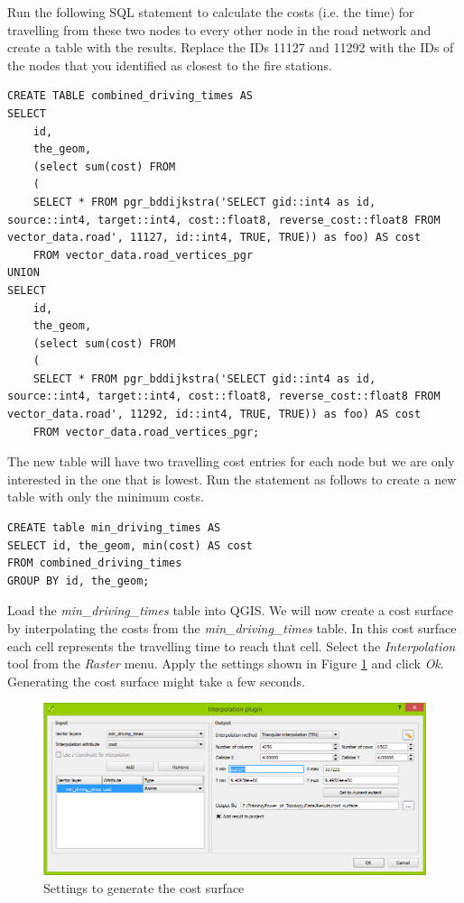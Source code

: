 \documentclass[a4paper,12pt,titlepage]{article}
\begin{document}
Run the following SQL statement to calculate the costs (i.e. the time) for travelling from these two nodes to every other node in the road network and create a table with the results. Replace the IDs 11127 and 11292 with the IDs of the nodes that you identified as closest to the fire stations.

\begin{lstlisting}[caption={Calculating travelling costs}]
CREATE TABLE combined_driving_times AS
SELECT
    id,
    the_geom,
    (select sum(cost) FROM
    (
    SELECT * FROM pgr_bddijkstra('SELECT gid::int4 as id, source::int4, target::int4, cost::float8, reverse_cost::float8 FROM vector_data.road', 11127, id::int4, TRUE, TRUE)) as foo) AS cost
    FROM vector_data.road_vertices_pgr
UNION
SELECT
    id,
    the_geom,
    (select sum(cost) FROM
    (
    SELECT * FROM pgr_bddijkstra('SELECT gid::int4 as id, source::int4, target::int4, cost::float8, reverse_cost::float8 FROM vector_data.road', 11292, id::int4, TRUE, TRUE)) as foo) AS cost
    FROM vector_data.road_vertices_pgr;
\end{lstlisting}
 
The new table will have two travelling cost entries for each node but we are only interested in the one that is lowest. Run the statement as follows to create a new table with only the minimum costs. 

\begin{lstlisting}[caption={Extracting minimum travelling costs}]
CREATE table min_driving_times AS
SELECT id, the_geom, min(cost) AS cost
FROM combined_driving_times
GROUP BY id, the_geom;
\end{lstlisting}

Load the \textit{min\_driving\_times} table into QGIS. We will now create a cost surface by interpolating the costs from the \textit{min\_driving\_times} table. In this cost surface each cell represents the travelling time to reach that cell. Select the \textit{Interpolation} tool from the \textit{Raster} menu. Apply the settings shown in Figure \ref{fig:cost_surface_settings} and click \textit{Ok}. Generating the cost surface might take a few seconds.

\begin{figure}[htb]
	\centering
	\includegraphics[width=12cm]{Images/cost_surface_settings.png}
	\caption{Settings to generate the cost surface}\label{fig:cost_surface_settings}
\end{figure}
 
\end{document}
